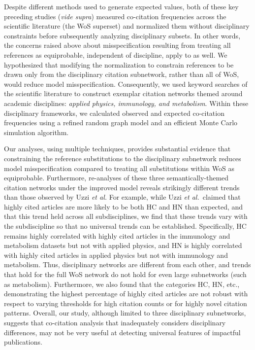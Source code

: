 \documentclass[NETN]{stjour}
\begin{document}
Despite different methods used to generate expected values, both of these key preceding studies (\emph{vide supra}) measured co-citation frequencies across the scientific literature (the WoS superset) and normalized them without disciplinary constraints before subsequently analyzing disciplinary subsets.
In other words, the concerns raised above about misspecification resulting from treating
all references as equiprobable, independent of discipline, apply to \cite{boyack_vs_uzzi_2014} as well.
 We hypothesized that modifying the normalization to constrain references to be drawn only from the disciplinary citation subnetwork,   rather than all of WoS, would reduce model misspecification.  Consequently, we used keyword searches of the scientific literature to construct exemplar citation networks themed around academic disciplines: \emph{applied physics, immunology, and metabolism}. Within these disciplinary frameworks, we calculated observed and expected co-citation frequencies using a refined random graph model and an efficient Monte Carlo simulation algorithm. 

Our analyses, using multiple techniques, provides substantial evidence that constraining the reference substitutions to the disciplinary subnetwork reduces model misspecification compared to treating all substitutions within WoS as equiprobable. 
Furthermore, re-analyses of these three semantically-themed
 citation networks  under the improved model reveals strikingly different trends than those 
 observed by Uzzi {\em et al.} 
 For example, while Uzzi {\em et al.}~claimed that highly cited articles are more likely to be both HC and HN than expected, and that this trend held across all subdisciplines, we find that these trends vary with the subdiscipline so that no universal trends can be established. Specifically, 
 HC remains highly correlated with highly cited articles in the immunology and metabolism datasets but not with applied physics, and HN is highly correlated with highly cited articles in applied physics but not with immunology and metabolism.  Thus, disciplinary networks are different from each other, and trends that hold for the full WoS network do not hold for even large subnetworks (such as metabolism). 
 Furthermore, we also found that the categories HC, HN, etc.,  demonstrating the highest percentage of highly cited articles are not robust with respect to varying thresholds for high citation counts or for highly novel citation patterns. Overall, our study, although limited to three disciplinary subnetworks, suggests that co-citation analysis that inadequately considers disciplinary differences, may not be very useful at detecting universal features of impactful publications.
\end{document}
